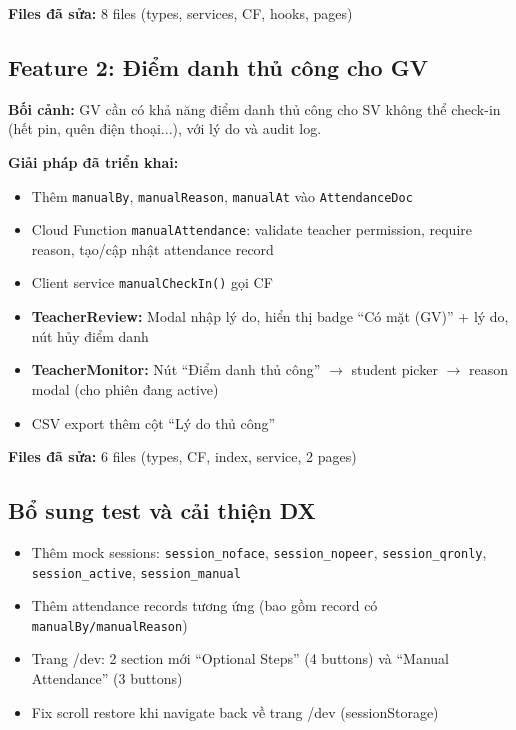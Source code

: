 \documentclass{article}
\begin{document}
\textbf{Files đã sửa:} 8 files (types, services, CF, hooks, pages)

\subsection{Feature 2: Điểm danh thủ công cho GV}

\textbf{Bối cảnh:} GV cần có khả năng điểm danh thủ công cho SV không thể check-in (hết pin, quên điện thoại...), với lý do và audit log.

\textbf{Giải pháp đã triển khai:}
\begin{itemize}[leftmargin=1.5em]
  \item Thêm \texttt{manualBy}, \texttt{manualReason}, \texttt{manualAt} vào \texttt{AttendanceDoc}
  \item Cloud Function \texttt{manualAttendance}: validate teacher permission, require reason, tạo/cập nhật attendance record
  \item Client service \texttt{manualCheckIn()} gọi CF
  \item \textbf{TeacherReview:} Modal nhập lý do, hiển thị badge ``Có mặt (GV)'' + lý do, nút hủy điểm danh
  \item \textbf{TeacherMonitor:} Nút ``Điểm danh thủ công'' $\rightarrow$ student picker $\rightarrow$ reason modal (cho phiên đang active)
  \item CSV export thêm cột ``Lý do thủ công''
\end{itemize}

\textbf{Files đã sửa:} 6 files (types, CF, index, service, 2 pages)

\subsection{Bổ sung test và cải thiện DX}

\begin{itemize}[leftmargin=1.5em]
  \item Thêm mock sessions: \texttt{session\_noface}, \texttt{session\_nopeer}, \texttt{session\_qronly}, \texttt{session\_active}, \texttt{session\_manual}
  \item Thêm attendance records tương ứng (bao gồm record có \texttt{manualBy/manualReason})
  \item Trang /dev: 2 section mới ``Optional Steps'' (4 buttons) và ``Manual Attendance'' (3 buttons)
  \item Fix scroll restore khi navigate back về trang /dev (sessionStorage)
\end{itemize}
\end{document}
